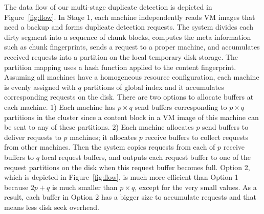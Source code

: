 The data flow of our multi-stage duplicate detection is depicted in Figure~\ref{fig:flow}.
In Stage 1, each machine independently reads
VM images that need a backup
and forms duplicate  detection requests.
The system divides  each dirty segment into a sequence of chunk blocks,  computes the meta
information such as chunk fingerprints,  sends a request to a proper machine, and accumulates
received requests into a partition on the local temporary disk storage.
The partition mapping uses a hash function applied to the content fingerprint.
Assuming all machines have a  homogeneous resource configuration, each machine is evenly  assigned with
$q$ partitions of global index and it accumulates corresponding requests on the disk.
There are two options to allocate buffers at each machine.
1) Each machine has  $p\times q$ send buffers corresponding to $p\times q$ partitions in the cluster
since a content block in a VM image of this machine can be sent to any of these partitions.
2) Each machine allocates $p$ send buffers to deliver requests to $p$ machines; it allocates
$p$ receive buffers to collect requests  from other machines.
Then the system copies requests from each of $p$ receive buffers to  $q$ local request buffers,
and outputs each request buffer to one of the request partitions on the disk
when this request buffer becomes full.  Option 2, which is  depicted in Figure~\ref{fig:flow},
is much more efficient than Option 1 because $2p+q$ is much smaller than
$p\times q$, except for the very small  values.
As a result, each buffer in Option 2 has a bigger size to accumulate requests and that means
less disk seek overhead.

